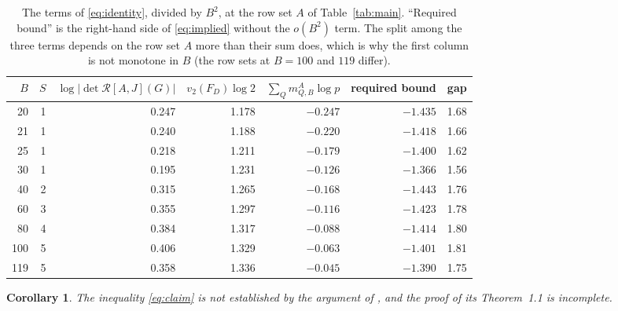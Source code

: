 \documentclass[11pt]{amsart}
\newtheorem{corollary}[theorem]{Corollary}
\theoremstyle{definition}
\begin{document}
\begin{table}[ht]\centering\small
\caption{The terms of \eqref{eq:identity}, divided by $B^2$, at the row set $A$ of Table~\ref{tab:main}.
``Required bound'' is the right-hand side of \eqref{eq:implied} without the $o(B^2)$ term. The split among the
three terms depends on the row set $A$ more than their sum does, which is why the first column is not monotone
in $B$ (the row sets at $B=100$ and $119$ differ).}\label{tab:locate}
\begin{tabular}{@{}rrrrrrr@{}}\toprule
$B$ & $S$ & $\log|\det\mathcal R[A,J](G)|$ & $v_2(F_D)\log2$ & $\sum_Qm^A_{Q,B}\log p$ & required bound & gap\\\midrule
20 & 1 & 0.247 & 1.178 & $-0.247$ & $-1.435$ & 1.68\\
21 & 1 & 0.240 & 1.188 & $-0.220$ & $-1.418$ & 1.66\\
25 & 1 & 0.218 & 1.211 & $-0.179$ & $-1.400$ & 1.62\\
30 & 1 & 0.195 & 1.231 & $-0.126$ & $-1.366$ & 1.56\\
40 & 2 & 0.315 & 1.265 & $-0.168$ & $-1.443$ & 1.76\\
60 & 3 & 0.355 & 1.297 & $-0.116$ & $-1.423$ & 1.78\\
80 & 4 & 0.384 & 1.317 & $-0.088$ & $-1.414$ & 1.80\\
100 & 5 & 0.406 & 1.329 & $-0.063$ & $-1.401$ & 1.81\\
119 & 5 & 0.358 & 1.336 & $-0.045$ & $-1.390$ & 1.75\\
\bottomrule\end{tabular}\end{table}

\begin{corollary}\label{cor:main}
The inequality \eqref{eq:claim} is not established by the argument of \cite{Sun26}, and the proof of its
Theorem~1.1 is incomplete.
\end{corollary}
\end{document}

